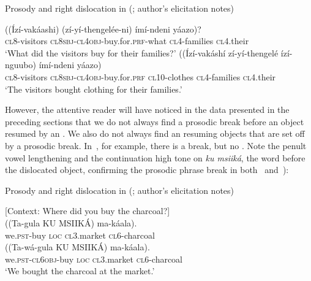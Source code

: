 \documentclass[output=paper]{LSP/langsci}
\begin{document}
\begin{exe}
\ex
\label{02-do-ex:28}%
Prosody and right dislocation in  (; author's elicitation notes)
\begin{xlist}
\gll ((Ízí-vakáashi) 	(zí-yí-thengelée-ni) 				ímí-ndeni 		yáazo)?\\
\textsc{cl8}-visitors 	\textsc{cl8sbj}-\textsc{cl4obj}-buy.for.\textsc{prf}-what 	\textsc{cl}4-families 		\textsc{cl}4.their\\
\glt ‘What did the visitors buy for their families?’
\gll ((Ízí-vakáshí 	zí-yí-thengelé		ízí-nguubo)	 	ímí-ndeni 	yáazo)\\
\textsc{cl}8-visitors 	\textsc{cl8sbj}-\textsc{cl4obj}-buy.for.\textsc{prf}	\textsc{cl10}-clothes	 	\textsc{cl}4-families 	\textsc{cl}4.their\\
\glt ‘The visitors bought clothing for their families.’
\end{xlist}
\end{exe}

However, the attentive reader will have noticed in the  data presented in the preceding sections that we do not always find a prosodic break before an object resumed by an . We also do not always find an  resuming objects that are set off by a prosodic break. In~, for example, there is a break, but no . Note the penult vowel lengthening and the continuation high tone on \textit{ku msiiká}, the word before the dislocated object, confirming the prosodic phrase break in both~ and~):

{
\begin{exe}
\ex
\label{02-do-ex:29}
Prosody and right dislocation in  (; author's elicitation notes)
\begin{xlist}
\ex
\label{02-do-ex:29a}
[Context: Where did you buy the charcoal?]\\
\gll
((Ta-gula 				KU 	MSIIKÁ) 			ma-káala).\\
we.\textsc{pst}-buy	\textsc{loc} 	\textsc{cl}3.market	\textsc{cl6}-charcoal\\%

\ex
\label{02-do-ex:29b}
\gll
((Ta-wá-gula 				KU 	MSIIKÁ) 		ma-káala).\\
	we.\textsc{pst}-\textsc{cl6obj}-buy	\textsc{loc}	\textsc{cl}3.market	\textsc{cl6}-charcoal\\%
\glt ‘We bought the charcoal at the market.’
\end{xlist}
\end{exe}
}
\end{document}
